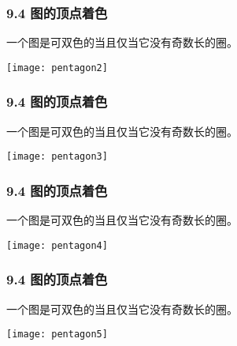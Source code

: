 \documentclass{beamer}
\begin{document}
\begin{CJK}{UTF8}{gbsn}
\begin{frame}
\begin{minipage}{0.45\linewidth}
  \end{minipage}
\end{frame}
\begin{frame}
  \frametitle{9.4 图的顶点着色}
  \begin{Thm2}
    一个图是可双色的当且仅当它没有奇数长的圈。
  \end{Thm2}
\vspace{1cm}
  \begin{minipage}{0.45\linewidth}
\texttt{[image: pentagon2]}    
  \end{minipage}
  \begin{minipage}{0.45\linewidth}
   
  \end{minipage}
\end{frame}

\begin{frame}
  \frametitle{9.4 图的顶点着色}
  \begin{Thm2}
    一个图是可双色的当且仅当它没有奇数长的圈。
  \end{Thm2}
\vspace{1cm}
  \begin{minipage}{0.45\linewidth}
\texttt{[image: pentagon3]}    
  \end{minipage}
  \begin{minipage}{0.45\linewidth}
   
  \end{minipage}
\end{frame}
\begin{frame}
  \frametitle{9.4 图的顶点着色}
  \begin{Thm2}
    一个图是可双色的当且仅当它没有奇数长的圈。
  \end{Thm2}
\vspace{1cm}
  \begin{minipage}{0.45\linewidth}
\texttt{[image: pentagon4]}    
  \end{minipage}
  \begin{minipage}{0.45\linewidth}
   
  \end{minipage}
\end{frame}
\begin{frame}
  \frametitle{9.4 图的顶点着色}
  \begin{Thm2}
    一个图是可双色的当且仅当它没有奇数长的圈。
  \end{Thm2}
\vspace{1cm}
  \begin{minipage}{0.45\linewidth}
\texttt{[image: pentagon5]}    
  \end{minipage}
  \begin{minipage}{0.45\linewidth}
   

\end{minipage}
\end{frame}
\end{CJK}
\end{document}
